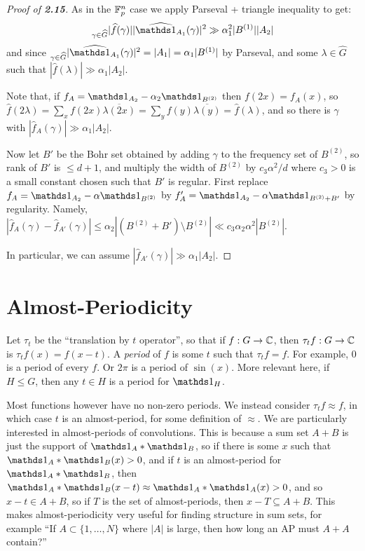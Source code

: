 \documentclass[10pt,a4paper]{article}
\let\E\relax
\DeclareMathOperator*{\E}{\raisebox{-0.45em}{\text{\huge $\mathds{E}$}}}
\begin{document}
\begin{proof}[Proof of \textbf{2.15}]
  As in the $\mathbb{F}_p^n$ case we apply Parseval + triangle inequality to get:
  \begin{align*}
    \E_{\gamma \in \hat{G}} |\hat{f}(\gamma)| |\hat{\one_{A_1}}(\gamma)|^2 \gg \alpha_1^2 |B^{(1)}||A_2|
  \end{align*}
  and since $\E_{\gamma \in \hat{G}}|\hat{\one_{A_1}}(\gamma)|^2 = |A_1| = \alpha_1 |B^{(1)}|$ by Parseval, and some $\lambda \in \hat{G}$ such that $|\hat{f}(\lambda)| \gg \alpha_1 |A_2|$.

  Note that, if $f_A = \one_{A_2} - \alpha_2 \one_{B^{(2)}}$ then $f(2x) = f_A(x)$, so $\hat{f}(2\lambda) = \sum_x f(2x)\overline{\lambda(2x)} = \sum_y f(y)\overline{\lambda(y)} = \hat{f}(\lambda)$, and so there is $\gamma$ with $|\hat{f}_A(\gamma)| \gg \alpha_1|A_2|$.

  Now let $B'$ be the Bohr set obtained by adding $\gamma$ to the frequency set of $B^{(2)}$, so rank of $B'$ is $\leq d+1$, and multiply the width of $B^{(2)}$ by $c_3 \alpha^2/d$ where $c_3 > 0$ is a small constant chosen such that $B'$ is regular. First replace $f_A = \one_{A_2}-\alpha \one_{B^{(2)}}$ by $f_A' = \one_{A_2} - \alpha \one_{B^{(2)} +B'}$ by regularity. Namely, $|\hat{f}_A(\gamma) - \hat{f}_{A'}(\gamma)| \leq \alpha_2|(B^{(2)}+B') \setminus B^{(2)}| \ll c_3\alpha_2\alpha^2|B^{(2)}|$.

  In particular, we can assume $|\hat{f}_{A'}(\gamma)| \gg \alpha_1 |A_2|$.
\end{proof}
\section{Almost-Periodicity}
Let $\tau_t$ be the ``translation by $t$ operator'', so that if $f:G \to \mathbb{C}$, then $\tau_t f:G \to \mathbb{C}$ is $\tau_t f(x) = f(x-t)$. A \emph{period} of $f$ is some $t$ such that $\tau_t f = f$. For example, $0$ is a period of every $f$. Or $2\pi$ is a period of $\sin(x)$. More relevant here, if $H \leq G$, then any $t \in H$ is a period for $\one_H$.

Most functions however have no non-zero periods. We instead consider $\tau_t f \approx f$, in which case $t$ is an almost-period, for some definition of $\approx$. We are particularly interested in almost-periods of convolutions. This is because a sum set $A+B$ is just the support of $\one_A \ast \one_B$, so if there is some $x$ such that $\one_A \ast \one_B(x) > 0$, and if $t$ is an almost-period for $\one_A \ast \one_B$, then $\one_A\ast \one_B(x-t) \approx \one_A \ast \one_A(x) > 0$, and so $x-t \in A+B$, so if $T$ is the set of almost-periods, then $x-T \subseteq A+B$. This makes almost-periodicity very useful for finding structure in sum sets, for example ``If $A \subset \{1, \ldots, N\}$ where $|A|$ is large, then how long an AP must $A+A$ contain?''
\end{document}

